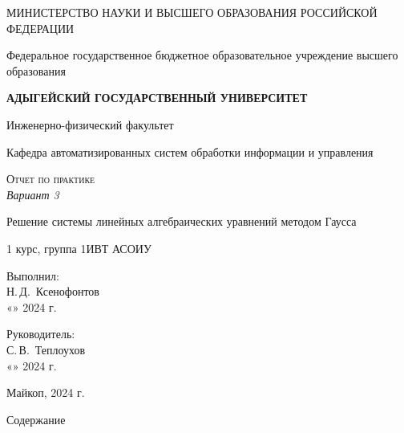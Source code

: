 \documentclass[12pt,a4paper]{scrartcl}
\begin{document}
	\begin{titlepage}
		\begin{center}
			\large
			МИНИСТЕРСТВО НАУКИ И ВЫСШЕГО ОБРАЗОВАНИЯ РОССИЙСКОЙ ФЕДЕРАЦИИ

			Федеральное государственное бюджетное образовательное учреждение высшего образования

			\textbf{АДЫГЕЙСКИЙ ГОСУДАРСТВЕННЫЙ УНИВЕРСИТЕТ}
			\vspace{0.25cm}

			Инженерно-физический факультет

			Кафедра автоматизированных систем обработки информации и управления
			\vfill

			\vfill

			\textsc{Отчет по практике}\\[5mm]

			\LARGE\textit{Вариант 3}

			{\LARGE Решение системы линейных алгебраических уравнений методом Гаусса}
			\bigskip

			1 курс, группа 1ИВТ АСОИУ
		\end{center}
		\vfill

		\newlength{\ML}
		\hfill\begin{minipage}{0.5\textwidth}
			Выполнил:\\
			\underline{\hspace{\ML}} Н.\,Д.~Ксенофонтов\\
			«\underline{\hspace{0.7cm}}» \underline{\hspace{2cm}} 2024 г.
		\end{minipage}%
		\bigskip

		\hfill\begin{minipage}{0.5\textwidth}
			Руководитель:\\
			\underline{\hspace{\ML}} С.\,В.~Теплоухов\\
			«\underline{\hspace{0.7cm}}» \underline{\hspace{2cm}} 2024 г.
		\end{minipage}%


		\vfill



		\begin{center}

			Майкоп, 2024 г.
		\end{center}
	\end{titlepage}
\LARGE{Содержание}
\end{document}
